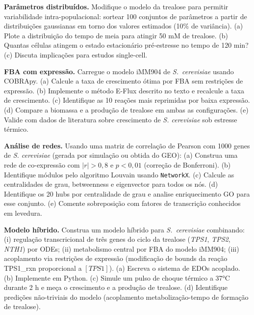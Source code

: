 \begin{exercicio}
\textbf{Parâmetros distribuídos.} Modifique o modelo da trealose para
permitir variabilidade intra-populacional: sortear 100 conjuntos de
parâmetros a partir de distribuições gaussianas em torno dos valores
estimados (10\% de variância). (a) Plote a distribuição do tempo de meia
para atingir 50 mM de trealose. (b) Quantas células atingem o estado
estacionário pré-estresse no tempo de 120 min? (c) Discuta implicações para
estudos single-cell.
\end{exercicio}

\begin{exercicio}
\textbf{FBA com expressão.} Carregue o modelo iMM904 de \textit{S.\
cerevisiae} usando COBRApy. (a) Calcule a taxa de crescimento ótima por FBA
sem restrições de expressão. (b) Implemente o método E-Flux descrito no
texto e recalcule a taxa de crescimento. (c) Identifique as 10 reações
mais reprimidas por baixa expressão. (d) Compare a biomassa e a produção
de trealose em ambas as configurações. (e) Valide com dados de
literatura sobre crescimento de \textit{S. cerevisiae} sob estresse
térmico.
\end{exercicio}

\begin{exercicio}
\textbf{Análise de redes.} Usando uma matriz de correlação de Pearson com
1000 genes de \textit{S. cerevisiae} (gerada por simulação ou obtida do
GEO): (a) Construa uma rede de co-expressão com $|r| > 0{,}8$ e
$p < 0{,}01$ (correção de Bonferroni). (b) Identifique módulos pelo
algoritmo Louvain usando \texttt{NetworkX}. (c) Calcule as centralidades de
grau, betweenness e eigenvector para todos os nós. (d) Identifique os 20
hubs por centralidade de grau e analise enriquecimento GO para esse
conjunto. (e) Comente sobreposição com fatores de transcrição conhecidos
em levedura.
\end{exercicio}

\begin{exercicio}
\textbf{Modelo híbrido.} Construa um modelo híbrido para \textit{S.\
cerevisiae} combinando: (i) regulação transcricional de três genes do
ciclo da trealose (\textit{TPS1}, \textit{TPS2}, \textit{NTH1}) por ODEs;
(ii) metabolismo central por FBA do modelo iMM904; (iii) acoplamento
via restrições de expressão (modificação de bounds da reação TPS1\_rxn
proporcional a $[\textit{TPS1}]$). (a) Escreva o sistema de EDOs acoplado.
(b) Implemente em Python. (c) Simule um pulso de choque térmico a 37°C
durante 2 h e meça o crescimento e a produção de trealose. (d) Identifique
predições não-triviais do modelo (acoplamento metabolização-tempo de
formação de trealose).
\end{exercicio}

